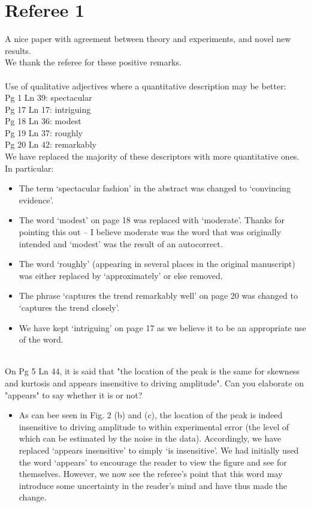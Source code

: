\documentclass[11pt]{article}
\newcommand{\comment}[1]{{\color{blue} #1}}
\begin{document}
\section*{Referee 1}

\noindent
\comment{A nice paper with agreement between theory and experiments, and novel new results.} \\

\noindent
We thank the referee for these positive remarks. \\ \\

\noindent
\comment{
Use of qualitative adjectives where a quantitative description may be better: \\
Pg 1 Ln 39: spectacular \\
Pg 17 Ln 17: intriguing \\
Pg 18 Ln 36: modest \\
Pg 19 Ln 37: roughly \\
Pg 20 Ln 42: remarkably} \\

\noindent
We have replaced the majority of these descriptors with more quantitative ones. In particular:
\begin{itemize}
\item The term `spectacular fashion' in the abstract was changed to `convincing evidence'.
\item The word `modest' on page 18 was replaced with `moderate'. Thanks for pointing this out -- I believe moderate was the word that was originally intended and `modest' was the result of an autocorrect.
\item The word `roughly' (appearing in several places in the original manuscript) was either replaced by `approximately' or else removed.
\item The phrase `captures the trend remarkably well' on page 20 was changed to `captures the trend closely'.
\item We have kept `intriguing' on page 17 as we believe it to be an appropriate use of the word.
\end{itemize}
\hphantom \\

\noindent
\comment{On Pg 5 Ln 44, it is said that "the location of the peak is the same for skewness and kurtosis and appears insensitive to driving amplitude". Can you elaborate on "appears" to say whether it is or not?}

\begin{itemize}
\item As can bee seen in Fig. 2 (b) and (c), the location of the peak is indeed insensitive to driving amplitude to within experimental error (the level of which can be estimated by the noise in the data). Accordingly, we have replaced `appears insensitive' to simply `is insensitive'.
We had initially used the word `appears' to encourage the reader to view the figure and see for themselves. However, we now see the referee's point that this word may introduce some uncertainty in the reader's mind and have thus made the change.
\end{itemize}
\end{document}
